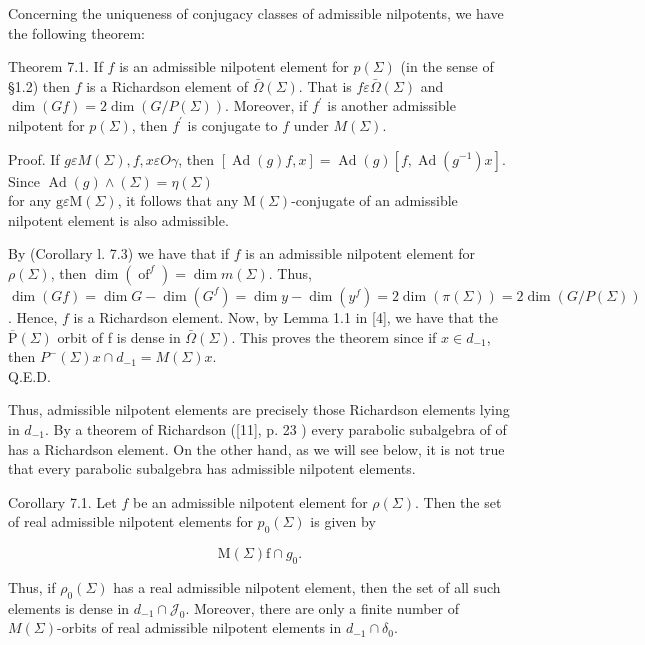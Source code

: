 \documentclass[10pt]{article}
\begin{document}
Concerning the uniqueness of conjugacy classes of admissible nilpotents, we have the following theorem:

Theorem 7.1. If $f$ is an admissible nilpotent element for $p(\Sigma)$ (in the sense of §1.2) then $f$ is a Richardson element of $\bar{\Omega}(\Sigma)$. That is $f \varepsilon \bar{\Omega}(\Sigma)$ and $\operatorname{dim}(G f)=2 \operatorname{dim}(G / P(\Sigma))$. Moreover, if $f^{\prime}$ is another admissible nilpotent for $p(\Sigma)$, then $f^{\prime}$ is conjugate to $f$ under $M(\Sigma)$.

Proof. If $g \varepsilon M(\Sigma), f, x \varepsilon O \gamma$, then $[\operatorname{Ad}(g) f, x]=\operatorname{Ad}(g)\left[f, \operatorname{Ad}\left(g^{-1}\right) x\right]$. Since $\operatorname{Ad}(g) \wedge(\Sigma)=\eta(\Sigma)$\\
for any $\mathrm{g} \varepsilon \mathrm{M}(\Sigma)$, it follows that any $\mathrm{M}(\Sigma)$-conjugate of an admissible nilpotent element is also admissible.

By (Corollary l. 7.3) we have that if $f$ is an admissible nilpotent element for $\rho(\Sigma)$, then $\operatorname{dim}\left(\operatorname{of}^{f}\right)=\operatorname{dim} m(\Sigma)$. Thus, $\operatorname{dim}(G f)=\operatorname{dim} G-\operatorname{dim}\left(G^{f}\right)=\operatorname{dim} y-\operatorname{dim}\left(y^{f}\right)= 2 \operatorname{dim}(\pi(\Sigma))=2 \operatorname{dim}(G / P(\Sigma))$. Hence, $f$ is a Richardson element. Now, by Lemma 1.1 in [4], we have that the $\overline{\mathrm{P}}(\Sigma)$ orbit of f is dense in $\bar{\Omega}(\Sigma)$. This proves the theorem since if $x \in d_{-1}$, then $P^{-}(\Sigma) x \cap d_{-1}=M(\Sigma) x$.\\
Q.E.D.

Thus, admissible nilpotent elements are precisely those Richardson elements lying in $d_{-1}$. By a theorem of Richardson ([11], p. 23 ) every parabolic subalgebra of of has a Richardson element. On the other hand, as we will see below, it is not true that every parabolic subalgebra has admissible nilpotent elements.

Corollary 7.1. Let $f$ be an admissible nilpotent element for $\rho(\Sigma)$. Then the set of real admissible nilpotent elements for $p_{0}(\Sigma)$ is given by


\begin{equation*}
\mathrm{M}(\Sigma) \mathrm{f} \cap g_{0} . \tag{6.1.2}
\end{equation*}


Thus, if $\rho_{0}(\Sigma)$ has a real admissible nilpotent element, then the set of all such elements is dense in $d_{-1} \cap \mathcal{J}_{0}$. Moreover, there are only a finite number of $M(\Sigma)$-orbits of real admissible nilpotent elements in $d_{-1} \cap \delta_{0}$.
\end{document}
